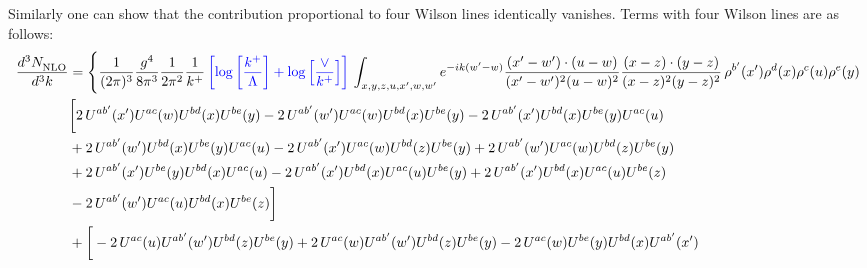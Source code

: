 \documentclass[aps,prd,amsmath,amssymb,nofootinbib]{revtex4-2}
\numberwithin{equation}{section}
\begin{document}
Similarly one can show that the contribution proportional to four Wilson lines identically vanishes. Terms with four Wilson lines are as follows:
\begin{align}
   \frac{d^{3}N_{\rm NLO}^{\rm}}{d^{3}k}  & =  \Bigg\{\frac{1}{(2\pi)^{3}}\frac{g^{4}}{8\pi^{3}}\frac{1}{2\pi^{2}} \frac{1}{k^{+}}\,{\color{blue}\left[\log{\left[\frac{k^{+}}{\Lambda}\right]}+\log{\left[\frac{\vee}{k^{+}}\right]}\right]}\,\int_{x,y,z,u,x^{\prime},w,w^{\prime}}e^{-ik(w^{\prime}-w)}\frac{(x^{\prime}-w^{\prime})\cdot (u-w)}{(x^{\prime}-w^{\prime})^{2} (u-w)^{2}} \frac{(x-z)\cdot (y-z)}{(x-z)^{2}(y-z)^{2}}\,\rho^{b^{\prime}}(x^{\prime})\rho^{d}(x)\rho^{c}(u)\rho^{e}(y)\notag \\ & \bigg[2\,U^{ab'}(x')U^{ac}(w)U^{bd}(x)U^{be}(y) -2\, U^{ab'}(w')U^{ac}(w)U^{bd}(x)U^{be}(y) - 2\,U^{ab'}(x')U^{bd}(x)U^{be}(y)U^{ac}(u) \notag \\  & + 2\, U^{ab'}(w')U^{bd}(x)U^{be}(y)U^{ac}(u)-2\,U^{ab'}(x')U^{ac}(w)U^{bd}(z)U^{be}(y) + 2\,U^{ab'}(w')U^{ac}(w)U^{bd}(z)U^{be}(y) \notag \\ &+2\,U^{ab'}(x')U^{be}(y)U^{bd}(x)U^{ac}(u) -2\,U^{ab'}(x')U^{bd}(x)U^{ac}(u)U^{be}(y) +2\, U^{ab'}(x')U^{bd}(x)U^{ac}(u)U^{be}(z) \notag \\ & - 2\,U^{ab'}(w')U^{ac}(u)U^{bd}(x)U^{be}(z)\bigg]\notag \\ & + \bigg[-2\,U^{ac}(u)U^{ab'}(w')U^{bd}(z)U^{be}(y) + 2\,U^{ac}(w)U^{ab'}(w')U^{bd}(z)U^{be}(y) - 2\,U^{ac}(w)U^{be}(y)U^{bd}(x)U^{ab'}(x') \notag \\

\end{align}
\end{document}

